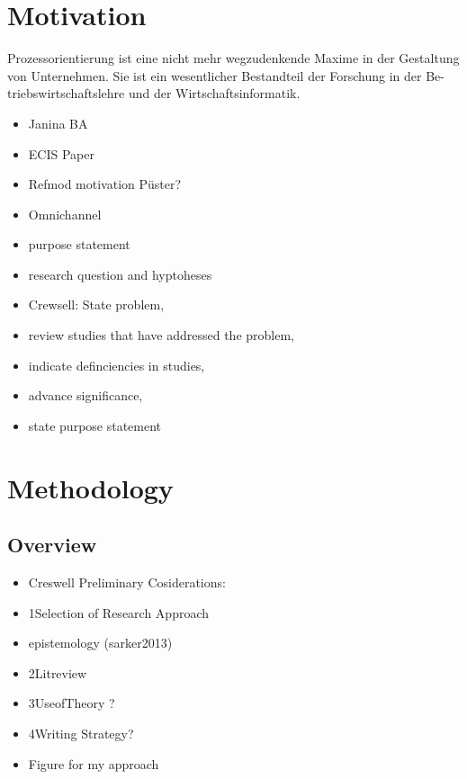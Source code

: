 
\chapter{Motivation}

Prozessorientierung ist eine nicht mehr wegzudenkende Maxime in der Gestaltung von Unternehmen. Sie ist ein wesentlicher Bestandteil der Forschung in der Be- triebswirtschaftslehre und der Wirtschaftsinformatik.

	\begin{itemize}
		\item Janina BA
		\item ECIS Paper
		\item Refmod motivation Püster?
		\item Omnichannel 
		\item purpose statement
		\item research question and hyptoheses
	\end{itemize}

	\begin{itemize}
		\item Crewsell: State problem, 
		\item review studies that have addressed the problem,
		\item  indicate definciencies in studies, 
		\item advance significance, 
		\item state purpose statement
	\end{itemize}
\chapter{Methodology}
	\section{Overview}
		\begin{itemize}
			\item Creswell Preliminary Cosiderations:
			\item 1Selection of Research Approach
			\item epistemology (sarker2013)
			\item 2Litreview
			\item 3UseofTheory ?
			\item 4Writing Strategy?
			\item Figure for my approach
		\end{itemize}
	
